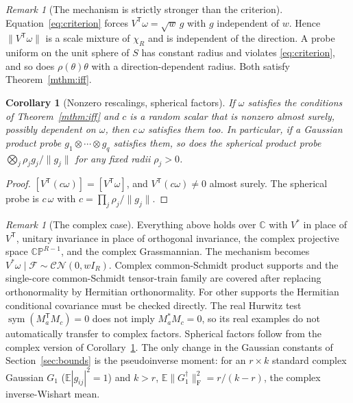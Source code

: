 \documentclass[11pt,a4paper]{article}
\newtheorem{corollary}[theorem]{Corollary}
\theoremstyle{definition}
\theoremstyle{remark}
\newtheorem{remark}[theorem]{Remark}
\numberwithin{equation}{section}
\newcommand{\E}{\mathbb E}
\newcommand{\C}{\mathbb C}
\newcommand{\T}{{\mathsf T}}
\newcommand{\sym}{\operatorname{sym}}
\newcommand{\norm}[1]{\lVert#1\rVert}
\newcommand{\F}{\mathrm F}
\begin{document}
\begin{remark}[The mechanism is strictly stronger than the criterion]
\label{rem:stronger}
Equation~\eqref{eq:criterion} forces $V^\T\omega=\sqrt w\,g$ with $g$
independent of $w$. Hence $\norm{V^\T\omega}$ is a scale mixture of $\chi_R$
and is independent of the direction. A probe uniform on the unit sphere of
$S$ has constant radius and violates \eqref{eq:criterion}, and so does
$\rho(\theta)\theta$ with a direction-dependent radius. Both satisfy
Theorem~\ref{mthm:iff}.
\end{remark}

\begin{corollary}[Nonzero rescalings, spherical factors]\label{cor:spherical}
If $\omega$ satisfies the conditions of Theorem~\ref{mthm:iff} and $c$ is a
random scalar that is nonzero almost surely, possibly dependent on $\omega$,
then $c\,\omega$ satisfies them too. In particular, if a Gaussian product
probe $g_1\otimes\cdots\otimes g_q$ satisfies them, so does the spherical
product probe $\bigotimes_j\rho_j g_j/\norm{g_j}$ for any fixed radii
$\rho_j>0$.
\end{corollary}

\begin{proof}
$[V^\T(c\omega)]=[V^\T\omega]$, and $V^\T(c\omega)\ne0$ almost surely. The
spherical probe is $c\,\omega$ with $c=\prod_j\rho_j/\norm{g_j}$.
\end{proof}

\begin{remark}[The complex case]\label{rem:complex}
Everything above holds over $\C$ with $V^*$ in place of $V^\T$, unitary
invariance in place of orthogonal invariance, the complex projective space
$\mathbb{CP}^{R-1}$, and the complex Grassmannian. The mechanism becomes
$V^*\omega\mid\mathcal F\sim\mathcal{CN}(0,wI_R)$. Complex common-Schmidt
product supports and the single-core common-Schmidt tensor-train family are
covered after replacing orthonormality by Hermitian orthonormality. For other
supports the Hermitian conditional covariance must be checked directly. The
real Hurwitz test $\sym(M_a^\T M_c)=0$ does not imply $M_a^*M_c=0$, so its
real examples do not automatically transfer to complex factors. Spherical
factors follow from the complex version of Corollary~\ref{cor:spherical}. The only
change in the Gaussian constants of Section~\ref{sec:bounds} is the
pseudoinverse moment: for an $r\times k$ standard complex Gaussian $G_1$
($\E|g_{ij}|^2=1$) and $k>r$, $\E\norm{G_1^\dagger}_\F^2=r/(k-r)$, the
complex inverse-Wishart mean.
\end{remark}
\end{document}
